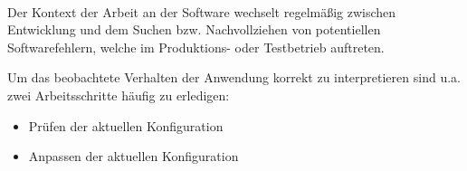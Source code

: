 \paragraph{}
Der Kontext der Arbeit an der Software wechselt regelmäßig zwischen Entwicklung und
dem Suchen bzw. Nachvollziehen von potentiellen Softwarefehlern, welche im Produktions-
oder Testbetrieb auftreten.

Um das beobachtete Verhalten der Anwendung korrekt zu interpretieren sind u.a. zwei
Arbeitsschritte häufig zu erledigen:

\begin{itemize}
    \item Prüfen der aktuellen Konfiguration
    \item Anpassen der aktuellen Konfiguration
\end{itemize}